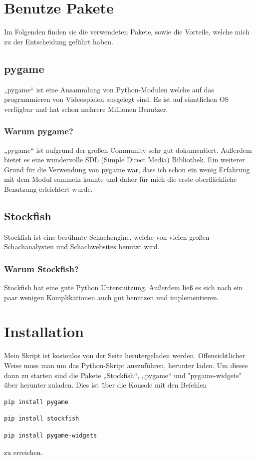 \documentclass[a4paper, 10pt]{scrartcl}
\begin{document}
\section{Benutze Pakete}
Im Folgenden finden sie die verwendeten Pakete, sowie die Vorteile, welche mich zu der Entscheidung geführt haben.

\subsection{pygame}
„pygame“ ist eine Ansammlung von Python-Modulen welche auf das programmieren von Videospielen ausgelegt sind. Es ist auf sämtlichen OS verfügbar und hat schon mehrere Millionen Benutzer.

\subsubsection{Warum pygame?}
„pygame“ ist aufgrund der großen Community sehr gut dokumentiert. Außerdem bietet es eine wundervolle SDL (Simple Direct Media) Bibliothek. Ein weiterer Grund für die Verwendung von pygame war, dass ich schon ein wenig Erfahrung mit dem Modul sammeln konnte und daher für mich die erste oberflächliche Benutzung erleichtert wurde. 

\subsection{Stockfish}
Stockfish ist eine berühmte Schachengine, welche von vielen großen Schachanalysten und Schachwebsites benutzt wird.

\subsubsection{Warum Stockfish?}
Stockfish hat eine gute Python Unterstützung. Außerdem ließ es sich nach ein paar wenigen Komplikationen auch gut benutzen und implementieren.

\section{Installation}
Mein Skript ist kostenlos von der Seite \href{https://github.com/Aetherion-dot/Chess_Python}{\color{blue}{github}} herutergeladen werden.
Offensichtlicher Weise muss man um das Python-Skript auszuführen, \href{https://www.python.org/downloads/}{\color{blue}{python3}} herunter laden. 
Um dieses dann zu starten sind die Pakete „Stockfish“, „pygame“ und "pygame-widgets" über \href{https://pypi.org/project/pip/}{\color{blue}{pip}} herunter zuladen.
Dies ist über die Konsole mit den Befehlen
\begin{lstlisting}[language=bash]
        pip install pygame
\end{lstlisting}
\begin{lstlisting}[language=bash]
        pip install stockfish
\end{lstlisting}
\begin{lstlisting}[language=bash]
        pip install pygame-widgets
\end{lstlisting}
zu erreichen.
\end{document}

